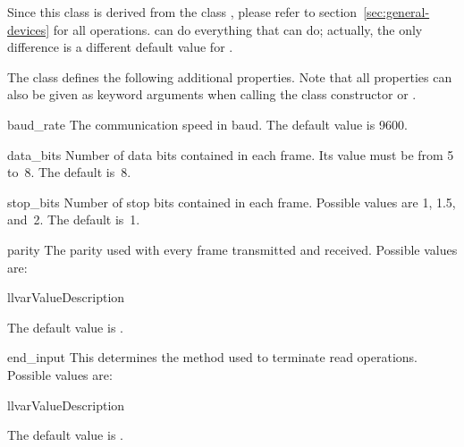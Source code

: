 \documentclass{howto}
\begin{document}
\begin{notice}
  Since this class is derived from the class , please refer
  to section~\ref{sec:general-devices} for all operations.
   can do everything that  can do;
  actually, the only difference is a different default value for
  .
\end{notice}

The class  defines the following additional properties.
Note that all properties can also be given as keyword arguments when calling
the class constructor or .

\begin{memberdesc}{baud_rate}
  The communication speed in baud.  The default value is 9600.
\end{memberdesc}

\begin{memberdesc}{data_bits}
  Number of data bits contained in each frame.  Its value must be from 5 to~8.
  The default is~8.
\end{memberdesc}

\begin{memberdesc}{stop_bits}
  Number of stop bits contained in each frame.  Possible values are 1, 1.5,
  and~2.  The default is~1.
\end{memberdesc}

\begin{memberdesc}{parity}
  The parity used with every frame transmitted and received.  Possible values
  are:

  \begin{tableii}{ll}{var}{Value}{Description}
  \end{tableii}

  The default value is .
\end{memberdesc}

\begin{memberdesc}{end_input}
  This determines the method used to terminate read operations.  Possible
  values are:

  \begin{tableii}{ll}{var}{Value}{Description}
  \end{tableii}

  The default value is .
\end{memberdesc}
\end{document}

